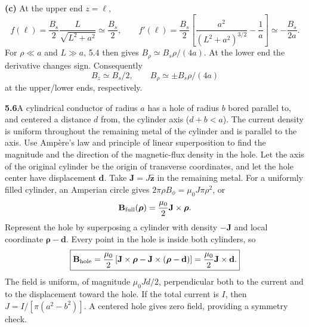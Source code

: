 \textbf{(c)} At the upper end $z=\ell$,
\[
f(\ell)=\frac{B_s}{2}\frac{L}{\sqrt{L^2+a^2}}
\simeq\frac{B_s}{2},\qquad
f'(\ell)=\frac{B_s}{2}
\left[\frac{a^2}{(L^2+a^2)^{3/2}}-\frac1a\right]
\simeq-\frac{B_s}{2a}.
\]
For $\rho\ll a$ and $L\gg a$, 5.4 then gives
$B_\rho\simeq B_s\rho/(4a)$. At the lower end the derivative changes
sign. Consequently
\[
\boxed{B_z\simeq B_s/2,\qquad
B_\rho\simeq\pm B_s\rho/(4a)}
\]
at the upper/lower ends, respectively.


\par\bigskip
\noindent\textbf{5.6}\quad A cylindrical conductor of radius $a$ has a hole of radius $b$ bored parallel to, and centered a distance $d$ from, the cylinder axis ($d+b<a$). The current density is uniform throughout the remaining metal of the cylinder and is parallel to the axis. Use Amp\`ere's law and principle of linear superposition to find the magnitude and the direction of the magnetic-flux density in the hole.
\solution
Let the axis of the original cylinder be the origin of transverse
coordinates, and let the hole center have displacement $\mathbf d$.
Take $\mathbf J=J\widehat{\mathbf z}$ in the remaining metal.
For a uniformly filled cylinder, an Amperian circle gives
$2\pi\rho B_\phi=\mu_0J\pi\rho^2$, or
\[
\mathbf B_{\rm full}(\boldsymbol\rho)
=\frac{\mu_0}{2}\mathbf J\times\boldsymbol\rho.
\]
Represent the hole by superposing a cylinder with density $-\mathbf J$
and local coordinate $\boldsymbol\rho-\mathbf d$. Every point in the
hole is inside both cylinders, so
\[
\boxed{\mathbf B_{\rm hole}
=\frac{\mu_0}{2}\left[\mathbf J\times\boldsymbol\rho
-\mathbf J\times(\boldsymbol\rho-\mathbf d)\right]
=\frac{\mu_0}{2}\mathbf J\times\mathbf d.}
\]
The field is uniform, of magnitude $\mu_0Jd/2$, perpendicular both to
the current and to the displacement toward the hole. If the total
current is $I$, then $J=I/[\pi(a^2-b^2)]$. A centered hole gives zero
field, providing a symmetry check.


